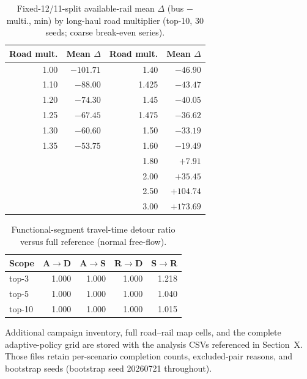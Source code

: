 \documentclass{ieeeaccess}
\begin{document}
\begin{table}[!t]
\caption{Fixed-12/11-split available-rail mean $\Delta$ (bus $-$ multi., min) by long-haul road multiplier (top-10, 30 seeds; coarse break-even series).}
\label{tab:fullroad}
\centering
\footnotesize
\begin{tabular}{@{}rr@{\qquad}rr@{}}
\hline
Road mult. & Mean $\Delta$ & Road mult. & Mean $\Delta$ \\
\hline
1.00 & $-101.71$ & 1.40 & $-46.90$ \\
1.10 & $-88.00$ & 1.425 & $-43.47$ \\
1.20 & $-74.30$ & 1.45 & $-40.05$ \\
1.25 & $-67.45$ & 1.475 & $-36.62$ \\
1.30 & $-60.60$ & 1.50 & $-33.19$ \\
1.35 & $-53.75$ & 1.60 & $-19.49$ \\
 & & 1.80 & $+7.91$ \\
 & & 2.00 & $+35.45$ \\
 & & 2.50 & $+104.74$ \\
 & & 3.00 & $+173.69$ \\
\hline
\end{tabular}
\end{table}

\begin{table}[!t]
\caption{Functional-segment travel-time detour ratio versus full reference (normal free-flow).}
\label{tab:scopelegs}
\centering
\footnotesize
\begin{tabular}{@{}lrrrr@{}}
\hline
Scope & A$\rightarrow$D & A$\rightarrow$S & R$\rightarrow$D & S$\rightarrow$R \\
\hline
top-3 & 1.000 & 1.000 & 1.000 & 1.218 \\
top-5 & 1.000 & 1.000 & 1.000 & 1.040 \\
top-10 & 1.000 & 1.000 & 1.000 & 1.015 \\
\hline
\end{tabular}
\end{table}

Additional campaign inventory, full road--rail map cells, and the complete adaptive-policy grid are stored with the analysis CSVs referenced in Section~X. Those files retain per-scenario completion counts, excluded-pair reasons, and bootstrap seeds (bootstrap seed 20260721 throughout).
\end{document}
